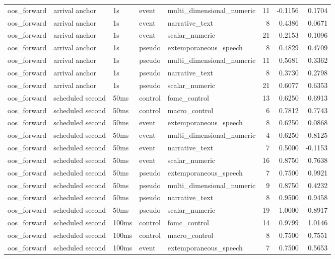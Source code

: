 \begin{tabular}{lllllrrr}
oos_forward & arrival anchor & 1s & event & multi_dimensional_numeric & 11 & -0.1156 & 0.1704 \\
oos_forward & arrival anchor & 1s & event & narrative_text & 8 & 0.4386 & 0.0671 \\
oos_forward & arrival anchor & 1s & event & scalar_numeric & 21 & 0.2153 & 0.1096 \\
oos_forward & arrival anchor & 1s & pseudo & extemporaneous_speech & 8 & 0.4829 & 0.4709 \\
oos_forward & arrival anchor & 1s & pseudo & multi_dimensional_numeric & 11 & 0.5681 & 0.3362 \\
oos_forward & arrival anchor & 1s & pseudo & narrative_text & 8 & 0.3730 & 0.2798 \\
oos_forward & arrival anchor & 1s & pseudo & scalar_numeric & 21 & 0.6077 & 0.6353 \\
oos_forward & scheduled second & 50ms & control & fomc_control & 13 & 0.6250 & 0.6913 \\
oos_forward & scheduled second & 50ms & control & macro_control & 6 & 0.7812 & 0.7743 \\
oos_forward & scheduled second & 50ms & event & extemporaneous_speech & 8 & 0.6250 & 0.0868 \\
oos_forward & scheduled second & 50ms & event & multi_dimensional_numeric & 4 & 0.6250 & 0.8125 \\
oos_forward & scheduled second & 50ms & event & narrative_text & 7 & 0.5000 & -0.1153 \\
oos_forward & scheduled second & 50ms & event & scalar_numeric & 16 & 0.8750 & 0.7638 \\
oos_forward & scheduled second & 50ms & pseudo & extemporaneous_speech & 7 & 0.7500 & 0.9921 \\
oos_forward & scheduled second & 50ms & pseudo & multi_dimensional_numeric & 9 & 0.8750 & 0.4232 \\
oos_forward & scheduled second & 50ms & pseudo & narrative_text & 8 & 0.9500 & 0.9458 \\
oos_forward & scheduled second & 50ms & pseudo & scalar_numeric & 19 & 1.0000 & 0.8917 \\
oos_forward & scheduled second & 100ms & control & fomc_control & 14 & 0.9799 & 1.0146 \\
oos_forward & scheduled second & 100ms & control & macro_control & 8 & 0.7500 & 0.7551 \\
oos_forward & scheduled second & 100ms & event & extemporaneous_speech & 7 & 0.7500 & 0.5653 \\

\end{tabular}

